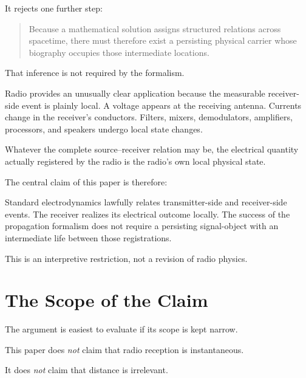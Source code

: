 \documentclass[12pt,onecolumn]{article}
\begin{document}
It rejects one further step:

\begin{quote}
Because a mathematical solution assigns structured relations across
spacetime, there must therefore exist a persisting physical carrier whose
biography occupies those intermediate locations.
\end{quote}

That inference is not required by the formalism.

Radio provides an unusually clear application because the measurable
receiver-side event is plainly local. A voltage appears at the receiving
antenna. Currents change in the receiver's conductors. Filters, mixers,
demodulators, amplifiers, processors, and speakers undergo local state
changes.

Whatever the complete source--receiver relation may be, the electrical
quantity actually registered by the radio is the radio's own local
physical state.

The central claim of this paper is therefore:

\begin{mdframed}[
linewidth=0.8pt,
innertopmargin=10pt,
innerbottommargin=10pt,
innerrightmargin=14pt,
innerleftmargin=14pt,
backgroundcolor=gray!15,
leftmargin=0.33in,
rightmargin=0.33in
]
\normalsize\itshape

Standard electrodynamics lawfully relates transmitter-side and
receiver-side events. The receiver realizes its electrical outcome
locally. The success of the propagation formalism does not require a
persisting signal-object with an intermediate life between those
registrations.

\end{mdframed}

This is an interpretive restriction, not a revision of radio physics.

\section{The Scope of the Claim}

The argument is easiest to evaluate if its scope is kept narrow.

This paper does \emph{not} claim that radio reception is instantaneous.

It does \emph{not} claim that distance is irrelevant.
\end{document}
